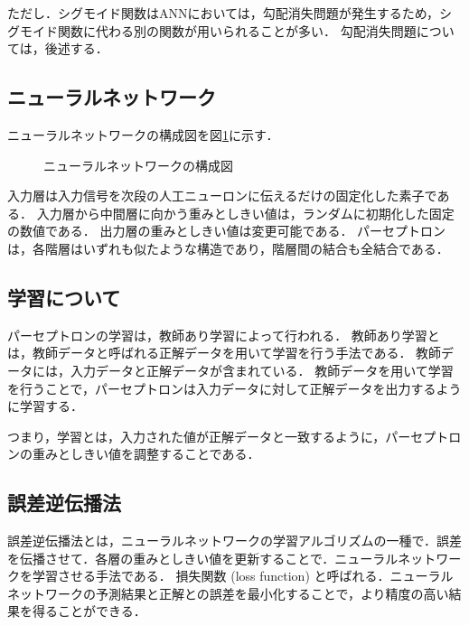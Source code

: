 \documentclass[a4j,12pt,dvipdfmx]{jreport}
\begin{document}
ただし．シグモイド関数はANNにおいては，勾配消失問題が発生するため，シグモイド関数に代わる別の関数が用いられることが多い．
勾配消失問題については，後述する．

\subsection{ニューラルネットワーク}
ニューラルネットワークの構成図を図\ref{fig:perceptron}に示す．

\begin{figure}[t]
  \centering
  \caption{ニューラルネットワークの構成図}
  \label{fig:perceptron}
\end{figure}

入力層は入力信号を次段の人工ニューロンに伝えるだけの固定化した素子である．
入力層から中間層に向かう重みとしきい値は，ランダムに初期化した固定の数値である．
出力層の重みとしきい値は変更可能である．
パーセプトロンは，各階層はいずれも似たような構造であり，階層間の結合も全結合である．


\subsection{学習について}
パーセプトロンの学習は，教師あり学習によって行われる．
教師あり学習とは，教師データと呼ばれる正解データを用いて学習を行う手法である．
教師データには，入力データと正解データが含まれている．
教師データを用いて学習を行うことで，パーセプトロンは入力データに対して正解データを出力するように学習する．

つまり，学習とは，入力された値が正解データと一致するように，パーセプトロンの重みとしきい値を調整することである．

\subsection{誤差逆伝播法}
誤差逆伝播法とは，ニューラルネットワークの学習アルゴリズムの一種で．誤差を伝播させて．各層の重みとしきい値を更新することで．ニューラルネットワークを学習させる手法である．
損失関数 (loss function) と呼ばれる．ニューラルネットワークの予測結果と正解との誤差を最小化することで，より精度の高い結果を得ることができる．
\end{document}
